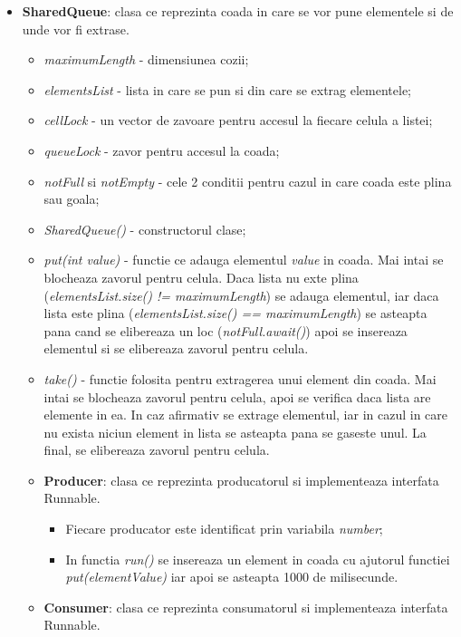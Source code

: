 \documentclass{article}
\begin{document}
\begin{itemize}
    \item \textbf{SharedQueue}: clasa ce reprezinta coada in care se vor pune elementele si de unde vor fi extrase.
    \begin{itemize}
        \item \textit{maximumLength} - dimensiunea cozii;
        \item \textit{elementsList} - lista in care se pun si din care se extrag elementele;
        \item \textit{cellLock} - un vector de zavoare pentru accesul la fiecare celula a listei;
        \item \textit{queueLock} - zavor pentru accesul la coada;
        \item \textit{notFull} si \textit{notEmpty} - cele 2 conditii pentru cazul in care coada este plina sau goala;
        \item \textit{SharedQueue()} - constructorul clase;
        \item \textit{put(int value)} - functie ce adauga elementul \textit{value} in coada. Mai intai se blocheaza zavorul pentru celula. Daca lista nu exte plina (\textit{elementsList.size() != maximumLength}) se adauga elementul, iar daca lista este plina (\textit{elementsList.size() == maximumLength}) se asteapta pana cand se elibereaza un loc (\textit{notFull.await()}) apoi se insereaza elementul si se elibereaza zavorul pentru celula.
        \item \textit{take()} - functie folosita pentru extragerea unui element din coada. Mai intai se blocheaza zavorul pentru celula, apoi se verifica daca lista are elemente in ea. In caz afirmativ se extrage elementul, iar in cazul in care nu exista niciun element in lista se asteapta pana se gaseste unul. La final, se elibereaza zavorul pentru celula. 
    \item \textbf{Producer}: clasa ce reprezinta producatorul si implementeaza interfata Runnable.
    \begin{itemize}
        \item Fiecare producator este identificat prin variabila \textit{number};
        \item In functia \textit{run()} se insereaza un element in coada cu ajutorul functiei \textit{put(elementValue)} iar apoi se asteapta 1000 de milisecunde.
    \end{itemize}
    \item \textbf{Consumer}: clasa ce reprezinta consumatorul si implementeaza interfata Runnable.

\end{itemize}
\end{itemize}
\end{document}
